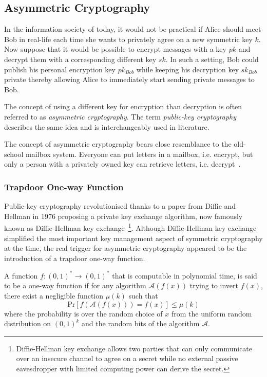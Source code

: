 \subsection{Asymmetric Cryptography}
In the information society of today, it would not be practical if Alice should meet Bob in real-life each time she wants to privately agree on a new symmetric key $k$. Now suppose that it would be possible to encrypt messages with a key $pk$ and decrypt them with a corresponding different key $sk$. In such a setting, Bob could publish his personal encryption key $pk_{Bob}$ while keeping his decryption key $sk_{Bob}$ private thereby allowing Alice to immediately start sending private messages to Bob.

The concept of using a different key for encryption than decryption is often referred to as \textit{asymmetric cryptography}. The term \textit{public-key cryptography} describes the same idea and is interchangeably used in literature.

The concept of asymmetric cryptography bears close resemblance to the old-school mailbox system. Everyone can put letters in a mailbox, i.e. encrypt, but only a person with a privately owned key can retrieve letters, i.e. decrypt~\cite{book:PaarP10}.

\subsubsection{Trapdoor One-way Function}
Public-key cryptography revolutionised thanks to a paper from Diffie and Hellman in 1976 proposing a private key exchange algorithm, now famously known as Diffie-Hellman key exchange~\cite{art:DiffieH76}\footnote{Diffie-Hellman key exchange allows two parties that can only communicate over an insecure channel to agree on a secret while no external passive eavesdropper with limited computing power can derive the secret.}. Although Diffie-Hellman key exchange simplified the most important key management aspect of symmetric cryptography at the time, the real trigger for asymmetric cryptography appeared to be the introduction of a trapdoor one-way function.

\begin{defn}
\label{def:one-way_function}
 A function $f: \left( 0, 1 \right)^* \rightarrow \left( 0, 1 \right)^*$ that is computable in polynomial time, is said to be a one-way function if for any algorithm $\mathcal{A}\left( f \left( x \right) \right)$ trying to invert $f \left( x \right)$, there exist a negligible function $\mu \left( k \right) $ such that
 \begin{equation*}
  \textrm{Pr} \left[ f \left( \mathcal{A} \left( f \left( x \right) \right) \right) = f \left( x \right) \right] \leq \mu \left( k \right)
 \end{equation*}
 where the probability is over the random choice of $x$ from the uniform random distribution on $\left( 0, 1 \right)^k$ and the random bits of the algorithm $\mathcal{A}$.
\end{defn}

